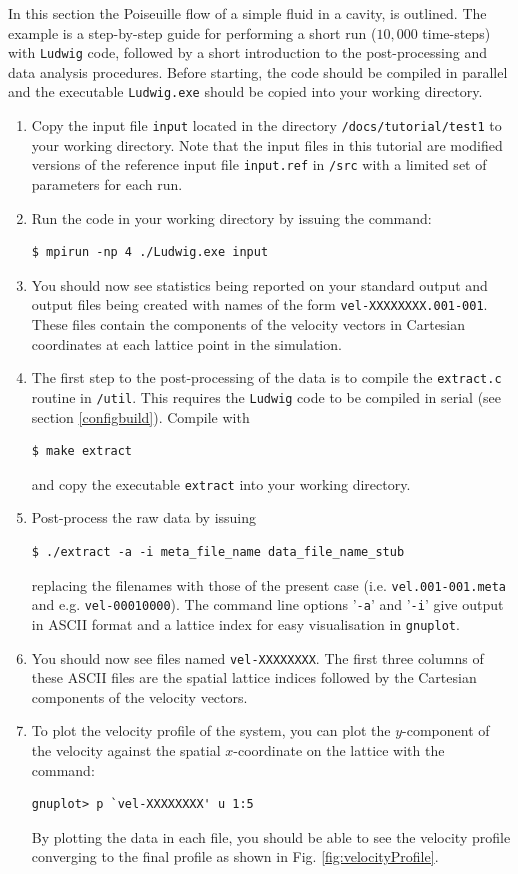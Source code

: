 \documentclass[11pt,twoside,a4paper]{article}
\begin{document}
In this section the Poiseuille flow of a simple fluid in a cavity, is outlined. 
The example is a step-by-step guide for performing a short run ($10,000$ time-steps) 
with \texttt{Ludwig} code, followed by a short introduction to the post-processing 
and data analysis procedures. Before starting, the code should be compiled in 
parallel and the executable \texttt{Ludwig.exe} should be copied into your working directory.
\begin{enumerate}
\item Copy the input file \texttt{input} located in the directory \texttt{/docs/tutorial/test1} 
to your working directory. Note that the input files in this tutorial are modified versions of the 
reference input file \texttt{input.ref} in \texttt{/src} with a limited set of parameters
for each run.
\item Run the code in your working directory by issuing the command:
\begin{lstlisting}
$ mpirun -np 4 ./Ludwig.exe input
\end{lstlisting}

\item You should now see statistics being reported on your standard output and 
output files being created with names of the form \texttt{vel-XXXXXXXX.001-001}. 
These files contain the components of the velocity vectors in Cartesian coordinates at each lattice point in the simulation. 
\item The first step to the post-processing of the data is to compile the \texttt{extract.c} 
routine in \texttt{/util}. This requires the \texttt{Ludwig} code to be compiled in serial 
(see section \ref{configbuild}). Compile with 
\begin{lstlisting}
$ make extract 
\end{lstlisting} 
and copy the executable \texttt{extract} into your working directory.
\item Post-process the raw data by issuing 
\begin{lstlisting}
$ ./extract -a -i meta_file_name data_file_name_stub
\end{lstlisting} 
replacing the filenames with those of the present case (i.e. \texttt{vel.001-001.meta} and e.g. \texttt{vel-00010000}).
The command line options '\texttt{-a}' and '\texttt{-i}' give output in ASCII format and a lattice index 
for easy visualisation in \texttt{gnuplot}.

\item You should now see files named \texttt{vel-XXXXXXXX}.  The first three columns of these ASCII files are the spatial lattice indices followed by the Cartesian components of the velocity vectors.\\
\item To plot the velocity profile of the system, you can plot the $y$-component of the velocity against 
the spatial $x$-coordinate on the lattice with the command:
\begin{lstlisting}
gnuplot> p `vel-XXXXXXXX' u 1:5
\end{lstlisting} 
By plotting the data in each file, you should be able to see the velocity profile converging to the final profile as shown in Fig. \ref{fig:velocityProfile}. 


\end{enumerate}
\end{document}
